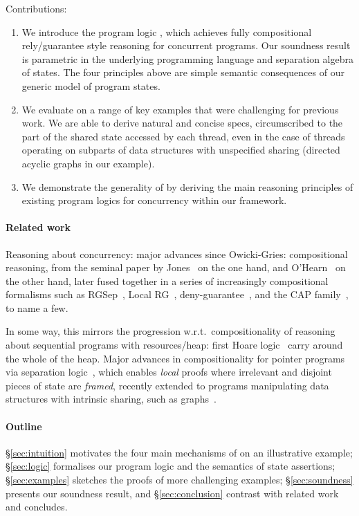 Contributions:
\begin{enumerate}
\item
  We introduce the program logic \colosl, which achieves fully
  compositional rely/guarantee style reasoning for concurrent
  programs. Our soundness result is parametric in the underlying
  programming language and separation algebra of states. The four
  principles above are simple semantic consequences of our generic
  model of program states.
\item
  We evaluate \colosl on a range of key examples that were challenging
  for previous work. We are able to derive natural and concise specs,
  circumscribed to the part of the shared state accessed by each
  thread, even in the case of threads operating on subparts of data
  structures with unspecified sharing (directed acyclic graphs in our
  example).
\item
  We demonstrate the generality of \colosl by deriving the main
  reasoning principles of existing program logics for concurrency
  within our framework.
\end{enumerate}

\paragraph{Related work}
Reasoning about concurrency: major advances since Owicki-Gries:
compositional reasoning, from the seminal paper by Jones~\cite{rg} on
the one hand, and O'Hearn~\cite{csl-orig,csl-tcs} on the other hand,
later fused together in a series of increasingly compositional
formalisms such as RGSep~\cite{viktor-marriage}, Local RG~\cite{lrg},
deny-guarantee~\cite{dg}, and the CAP
family~\cite{cap-ecoop10,icap,tada}, to name a few.


In some way, this mirrors the progression w.r.t.\ compositionality of
reasoning about sequential programs with resources/heap: first Hoare
logic~\cite{hoarelogic} carry around the whole of the heap. Major
advances in compositionality for pointer programs via separation
logic~\cite{seplog}, which enables \emph{local} proofs where
irrelevant and disjoint pieces of state are \emph{framed}, recently
extended to programs manipulating data structures with intrinsic
sharing, such as graphs~\cite{ramification}.


\paragraph{Outline}
\S\ref{sec:intuition} motivates the four main mechanisms of \colosl on
an illustrative example; \S\ref{sec:logic} formalises our program
logic and the semantics of state assertions; \S\ref{sec:examples}
sketches the proofs of more challenging examples;
\S\ref{sec:soundness} presents our soundness result, and
\S\ref{sec:conclusion} contrast with related work and concludes.
